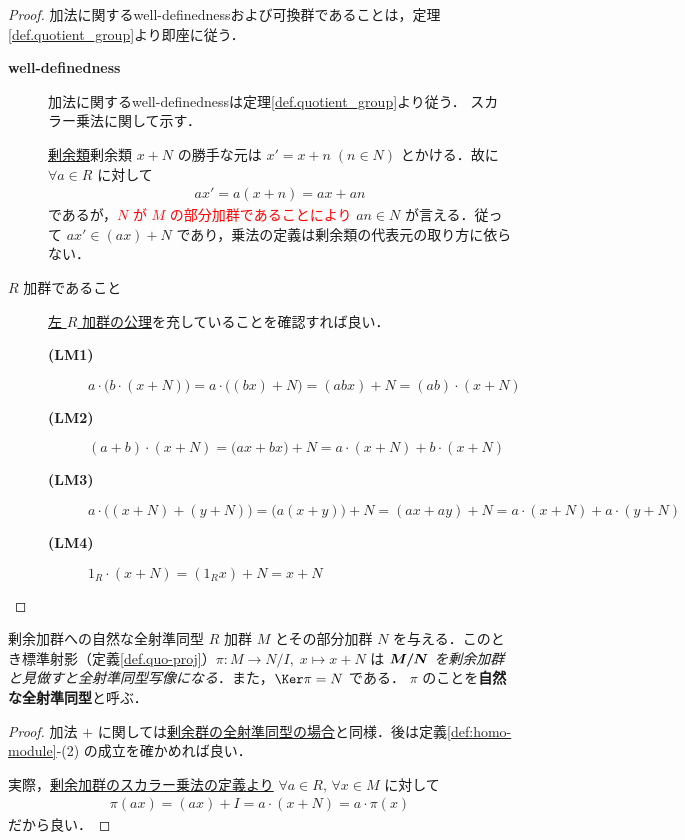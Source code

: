 \documentclass[geometry_main]{subfiles}
\begin{document}
\begin{proof}
	加法に関するwell-definednessおよび可換群であることは，定理\ref{def.quotient_group}より即座に従う．
	\begin{description}
		\item[\textbf{well-definedness}] 加法に関するwell-definednessは定理\ref{def.quotient_group}より従う．
		スカラー乗法に関して示す．

		\hyperref[def.class_residue]{剰余類}剰余類 $x+N$ の勝手な元は $x' = x+n\; (n\in N)$ とかける．故に $\forall a \in R$ に対して
		\begin{align}
			ax' = a(x+n) = ax + an
		\end{align}
		であるが，\textcolor{red}{$N$ が $M$ の部分加群であることにより} $an \in N$ が言える．従って $ax' \in (ax) + N$ であり，乗法の定義は剰余類の代表元の取り方に依らない．
		\item[$R$ 加群であること] \hyperref[ax:module]{左 $R$ 加群の公理}を充していることを確認すれば良い．
		\begin{description}
			\item[\textbf{(LM1)}] $a \cdot \bigl(b \cdot (x+N)\bigr) = a \cdot \bigl( (bx) + N \bigr) = (abx) + N = (ab) \cdot (x+N)$
			\item[\textbf{(LM2)}] $(a+b) \cdot (x+N) = \bigl( ax + bx \bigr) + N = a \cdot (x+N) + b \cdot (x+N)$
			\item[\textbf{(LM3)}] $a \cdot \bigl( (x+N) + (y+N) \bigr) = \bigl( a(x+y) \bigr) + N = (ax+ay) + N = a \cdot (x+N) + a \cdot (y+N)$
			\item[\textbf{(LM4)}] $1_R \cdot (x+N) = (1_Rx) +N = x+ N$
		\end{description}
	\end{description}
\end{proof}

\begin{mycol}[label=natural-homo-module]{剰余加群への自然な全射準同型}
	$R$ 加群 $M$ とその部分加群 $N$ を与える．このとき標準射影（定義\ref{def.quo-proj}）$\pi \colon M \to N/I,\; x \mapsto x+N$ は\emph{ $\vb*{M/N}$ を剰余加群と見做すと全射準同型写像になる}．また，$\Ker \pi = N$ である．
	$\pi$ のことを\textbf{自然な全射準同型}と呼ぶ．
\end{mycol}

\begin{proof}
	加法 $+$ に関しては\hyperref[natural-homo]{剰余群の全射準同型の場合}と同様．後は定義\ref{def:homo-module}-(2) の成立を確かめれば良い．

	実際，\hyperref[def:quotient-ring]{剰余加群のスカラー乗法の定義より} $\forall a\in R,\, \forall x \in M$ に対して
	\begin{align}
		\pi(ax) = (ax) + I = a \cdot (x+N) = a \cdot \pi(x)
	\end{align}
	だから良い．
\end{proof}
\end{document}
